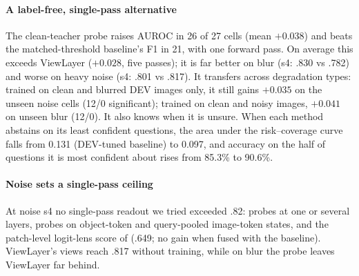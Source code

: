\documentclass[10pt,a4paper]{article}
\newcommand{\ours}{ViewLayer}
\begin{document}
\paragraph{A label-free, single-pass alternative} The clean-teacher probe raises AUROC in 26 of 27 cells (mean $+0.038$) and beats the matched-threshold baseline's F1 in 21, with one forward pass. On average this exceeds \ours{} ($+0.028$, five passes); it is far better on blur (s4: .830 vs .782) and worse on heavy noise (s4: .801 vs .817). It transfers across degradation types: trained on clean and blurred DEV images only, it still gains $+0.035$ on the unseen noise cells (12/0 significant); trained on clean and noisy images, $+0.041$ on unseen blur (12/0). It also knows when it is unsure. When each method abstains on its least confident questions, the area under the risk--coverage curve falls from 0.131 (DEV-tuned baseline) to 0.097, and accuracy on the half of questions it is most confident about rises from 85.3\% to 90.6\%.

\paragraph{Noise sets a single-pass ceiling} At noise s4 no single-pass readout we tried exceeded .82: probes at one or several layers, probes on object-token and query-pooled image-token states, and the patch-level logit-lens score of \citet{jiang2025interpreting} (.649; no gain when fused with the baseline). \ours{}'s views reach .817 without training, while on blur the probe leaves \ours{} far behind.
\end{document}
